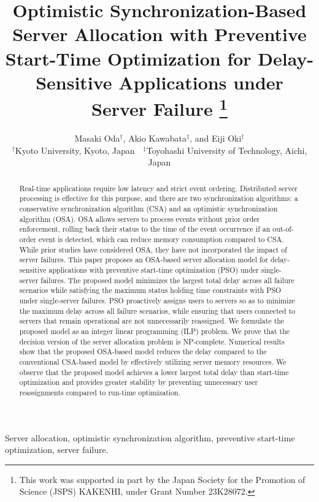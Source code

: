 \documentclass[10pt, letterpaper]{IEEEtran}
\newcommand\red[1]{\textcolor{red}{#1}}
\begin{document}
\begin{CJK}{UTF8}{ipxm}

\title{\Large
Optimistic Synchronization-Based Server Allocation with Preventive Start-Time Optimization for Delay-Sensitive Applications under Server Failure
\thanks{This work was supported in part by the Japan Society for the Promotion of Science (JSPS) KAKENHI, under Grant Number 23K28072.}
}
\author{Masaki Oda$^\dag$, Akio Kawabata$^\ddag$, and Eiji Oki$^\dag$\\
$^\dag$Kyoto University, Kyoto, Japan\ \ $^\ddag$Toyohashi University of Technology, Aichi, Japan} 
\maketitle

\begin{abstract}
Real-time applications require low latency and strict event ordering.  
Distributed server processing is effective for this purpose, and there are two synchronization algorithms: a conservative synchronization algorithm (CSA) and an optimistic synchronization algorithm (OSA).
OSA allows servers to process events without prior order enforcement, rolling back their status to the time of the event occurrence if an out-of-order event is detected, which can reduce memory consumption compared to CSA.
While prior studies have considered OSA, they have not incorporated the impact of server failures. 
This paper proposes an OSA-based server allocation model for delay-sensitive applications with preventive start-time optimization (PSO) under single-server failures.
The proposed model minimizes the largest total delay across all failure scenarios while satisfying the maximum status holding time constraints with PSO under single-server failures.
PSO proactively assigns users to servers so as to minimize the maximum delay across all failure scenarios, while ensuring that users connected to servers that remain operational are not unnecessarily reassigned.  
We formulate the proposed model as an integer linear programming (ILP) problem.  
We prove that the decision version of the server allocation problem is NP-complete. 
Numerical results show that the proposed OSA-based model reduces the delay compared to the conventional CSA-based model by effectively utilizing server memory resources.
We observe that the proposed model achieves a lower largest total delay than start-time optimization and provides greater stability by preventing unnecessary user reassignments compared to run-time optimization.
\end{abstract}
\begin{IEEEkeywords}
Server allocation, optimistic synchronization algorithm, preventive start-time optimization, server failure.
\end{IEEEkeywords}


\end{CJK}
\end{document}

